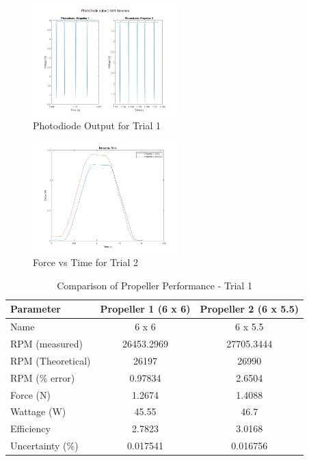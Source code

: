 \documentclass{article}
\begin{document}
\begin{figure}[H]
  \centering
  \includegraphics[width = 0.5\textwidth]{finalprojectimages/Trial1_PhotoDiode.png}
  \caption{Photodiode Output for Trial 1}
  \label{fig:photodiode}
\end{figure}

\begin{figure}[H]
  \centering
  \includegraphics[width = 0.5\textwidth]{finalprojectimages/Trial2_ForcevTime.png}
  \caption{Force vs Time for Trial 2}
  \label{fig:forcevtime2}
\end{figure}

\begin{table}[H]
  \centering
  \begin{tabular}{lcc}
  \hline
  \textbf{Parameter} & \textbf{Propeller 1 (6 x 6)} & \textbf{Propeller 2 (6 x 5.5)} \\
  \hline
  Name & 6 x 6 & 6 x 5.5 \\
  RPM (measured) & 26453.2969 & 27705.3444 \\
  RPM (Theoretical) & 26197 & 26990 \\
  RPM (\% error) & 0.97834 & 2.6504 \\
  Force (N) & 1.2674 & 1.4088 \\
  Wattage (W) & 45.55 & 46.7 \\
  Efficiency & 2.7823 & 3.0168 \\
  Uncertainty (\%) & 0.017541 & 0.016756 \\
  \hline
  \end{tabular}
  \caption{Comparison of Propeller Performance - Trial 1}
  \label{table:propeller_comparison1}
  \end{table}
\end{document}
